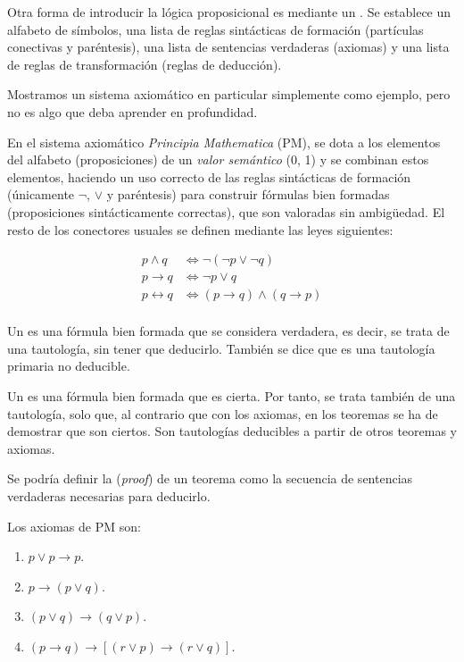 



Otra forma de introducir la lógica proposicional es mediante un
. Se establece un alfabeto de símbolos, una lista
de reglas sintácticas de formación (partículas conectivas y paréntesis), una
lista de sentencias verdaderas (axiomas) y una lista de reglas de
transformación (reglas de deducción).


Mostramos un sistema axiomático en particular simplemente como ejemplo, pero
no es algo que deba aprender en profundidad.

En el sistema axiomático \emph{Principia Mathematica} (PM), se dota a los
elementos del alfabeto (proposiciones) de un \emph{valor semántico} (0, 1) y
se combinan estos elementos, haciendo un uso correcto de las reglas
sintácticas de formación (únicamente $\neg$, $\lor$ y paréntesis) para
construir fórmulas bien formadas (proposiciones sintácticamente correctas),
que son valoradas sin ambigüedad. El resto de los conectores usuales se
definen mediante las leyes siguientes:

\begin{align*}
  p \land q           &\iff \neg(\neg p \lor \neg q) \\
  p \to q             &\iff \neg p \lor q \\
  p \leftrightarrow q &\iff (p \to q) \land (q \to p) \\
\end{align*}

Un  es una fórmula bien formada que se considera verdadera, es
decir, se trata de una tautología, sin tener que deducirlo. También se dice
que es una tautología primaria no deducible.

Un  es una fórmula bien formada que es cierta. Por tanto, se
trata también de una tautología, solo que, al contrario que con los axiomas,
en los teoremas se ha de demostrar que son ciertos. Son tautologías
deducibles a partir de otros teoremas y axiomas.

Se podría definir la  (\emph{proof}) de un teorema como
la secuencia de sentencias verdaderas necesarias para deducirlo.

Los axiomas de PM son:

\begin{enumerate}[label=\textbf{A\arabic*}., leftmargin=1.5cm]
  \item $p \lor p \to p$.
  \item $p \to (p \lor q)$.
  \item $(p \lor q) \to (q \lor p)$.
  \item $(p \to q) \to \left[(r \lor p) \to (r \lor q)\right]$.
\end{enumerate}


